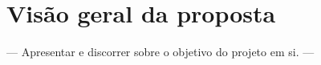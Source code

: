 
\section{Visão geral da proposta}

 — Apresentar e discorrer sobre o objetivo do projeto em si. — 





